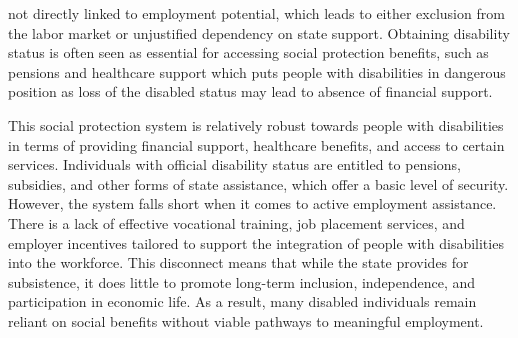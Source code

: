 \documentclass[14pt,a4paper, screen]{scrbook}
\begin{document}
not directly linked to employment potential, which leads to either exclusion from the labor market or unjustified dependency on state support. Obtaining disability status is often seen as essential for accessing social protection benefits, such as pensions and healthcare support which puts people with disabilities in dangerous position as loss of the disabled status may lead to absence of financial support. 
		
		This social protection system is relatively robust towards people with disabilities in terms of providing financial support, healthcare benefits, and access to certain services. Individuals with official disability status are entitled to pensions, subsidies, and other forms of state assistance, which offer a basic level of security. However, the system falls short when it comes to active employment assistance. There is a lack of effective vocational training, job placement services, and employer incentives tailored to support the integration of people with disabilities into the workforce. This disconnect means that while the state provides for subsistence, it does little to promote long-term inclusion, independence, and participation in economic life. As a result, many disabled individuals remain reliant on social benefits without viable pathways to meaningful employment. 
		
		
\end{document}
